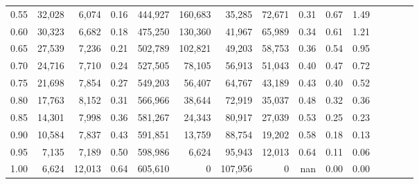 \begin{tabular}{rrrcrrrrrrrrrrr}
0.55 &  32,028 &   6,074 &                                       0.16 &  444,927 &  160,683 &   35,285 &   72,671 &  0.31 &  0.67 &                         1.49 \\
0.60 &  30,323 &   6,682 &                                       0.18 &  475,250 &  130,360 &   41,967 &   65,989 &  0.34 &  0.61 &                         1.21 \\
0.65 &  27,539 &   7,236 &                                       0.21 &  502,789 &  102,821 &   49,203 &   58,753 &  0.36 &  0.54 &                         0.95 \\
0.70 &  24,716 &   7,710 &                                       0.24 &  527,505 &   78,105 &   56,913 &   51,043 &  0.40 &  0.47 &                         0.72 \\
0.75 &  21,698 &   7,854 &                                       0.27 &  549,203 &   56,407 &   64,767 &   43,189 &  0.43 &  0.40 &                         0.52 \\
0.80 &  17,763 &   8,152 &                                       0.31 &  566,966 &   38,644 &   72,919 &   35,037 &  0.48 &  0.32 &                         0.36 \\
0.85 &  14,301 &   7,998 &                                       0.36 &  581,267 &   24,343 &   80,917 &   27,039 &  0.53 &  0.25 &                         0.23 \\
0.90 &  10,584 &   7,837 &                                       0.43 &  591,851 &   13,759 &   88,754 &   19,202 &  0.58 &  0.18 &                         0.13 \\
0.95 &   7,135 &   7,189 &                                       0.50 &  598,986 &    6,624 &   95,943 &   12,013 &  0.64 &  0.11 &                         0.06 \\
1.00 &   6,624 &  12,013 &                                       0.64 &  605,610 &        0 &  107,956 &        0 &   nan &  0.00 &                         0.00 \\
\bottomrule
\end{tabular}
